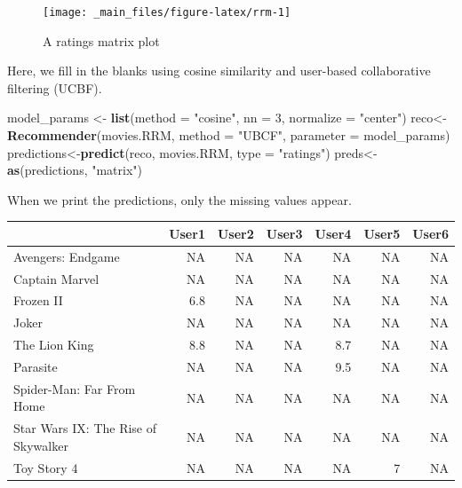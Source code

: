 \documentclass[
]{book}
\newenvironment{Shaded}{\begin{snugshade}}{\end{snugshade}}
\newcommand{\AttributeTok}[1]{\textcolor[rgb]{0.13,0.29,0.53}{#1}}
\newcommand{\DecValTok}[1]{\textcolor[rgb]{0.00,0.00,0.81}{#1}}
\newcommand{\FunctionTok}[1]{\textcolor[rgb]{0.13,0.29,0.53}{\textbf{#1}}}
\newcommand{\NormalTok}[1]{#1}
\newcommand{\OtherTok}[1]{\textcolor[rgb]{0.56,0.35,0.01}{#1}}
\newcommand{\StringTok}[1]{\textcolor[rgb]{0.31,0.60,0.02}{#1}}
\theoremstyle{definition}
\theoremstyle{definition}
\theoremstyle{definition}
\theoremstyle{definition}
\theoremstyle{remark}
\begin{document}
\begin{figure}

{\centering \texttt{[image: \_main\_files/figure-latex/rrm-1]} 

}

\caption{A ratings matrix plot}\label{fig:rrm}
\end{figure}

Here, we fill in the blanks using cosine similarity and user-based collaborative filtering (UCBF).

\begin{Shaded}
\begin{Highlighting}[]
\NormalTok{model\_params }\OtherTok{\textless{}{-}} \FunctionTok{list}\NormalTok{(}\AttributeTok{method =} \StringTok{"cosine"}\NormalTok{, }
                     \AttributeTok{nn =} \DecValTok{3}\NormalTok{,}
                     \AttributeTok{normalize =} \StringTok{"center"}\NormalTok{)}
\NormalTok{reco}\OtherTok{\textless{}{-}}\FunctionTok{Recommender}\NormalTok{(movies.RRM, }\AttributeTok{method =} \StringTok{"UBCF"}\NormalTok{,}
                  \AttributeTok{parameter =}\NormalTok{ model\_params)}
\NormalTok{predictions}\OtherTok{\textless{}{-}}\FunctionTok{predict}\NormalTok{(reco, movies.RRM, }\AttributeTok{type =} \StringTok{"ratings"}\NormalTok{)}
\NormalTok{preds}\OtherTok{\textless{}{-}}\FunctionTok{as}\NormalTok{(predictions, }\StringTok{"matrix"}\NormalTok{)}
\end{Highlighting}
\end{Shaded}

When we print the predictions, only the missing values appear.

\begin{longtable}{lrrrrrr}
\toprule
  & User1 & User2 & User3 & User4 & User5 & User6\\
\midrule
Avengers: Endgame & NA & NA & NA & NA & NA & NA\\
Captain Marvel & NA & NA & NA & NA & NA & NA\\
Frozen II & 6.8 & NA & NA & NA & NA & NA\\
Joker & NA & NA & NA & NA & NA & NA\\
The Lion King & 8.8 & NA & NA & 8.7 & NA & NA\\
Parasite & NA & NA & NA & 9.5 & NA & NA\\
Spider-Man: Far From Home & NA & NA & NA & NA & NA & NA\\
Star Wars IX: The Rise of Skywalker & NA & NA & NA & NA & NA & NA\\
Toy Story 4 & NA & NA & NA & NA & 7 & NA\\
\bottomrule
\end{longtable}
\end{document}
